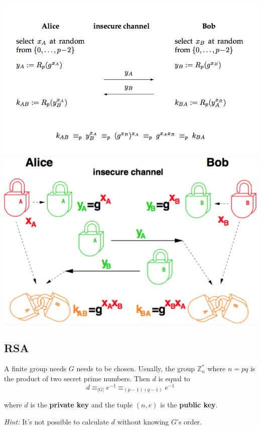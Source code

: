 \documentclass[11pt]{article}
\begin{document}
\begin{center}
	\includegraphics[width=400pt]{images/diffie-hellmann-1}
	\includegraphics[width=400pt]{images/diffie-hellmann-2}
\end{center}

\subsection{RSA}

A finite group needs $G$ needs to be chosen. Usually, the group $\mathbb{Z}_n^*$ where $n=pq$ is the product of two secret prime numbers. Then $d$ is equal to
\begin{equation*}
	d \equiv_{|G|} e^{-1} \equiv_{(p-1)(q-1)} e^{-1}
\end{equation*}

where $d$ is the \textbf{private key} and the tuple $(n,e)$ is the \textbf{public key}.

\emph{Hint:} It's not possible to calculate $d$ without knowing $G$'s order.
\end{document}
